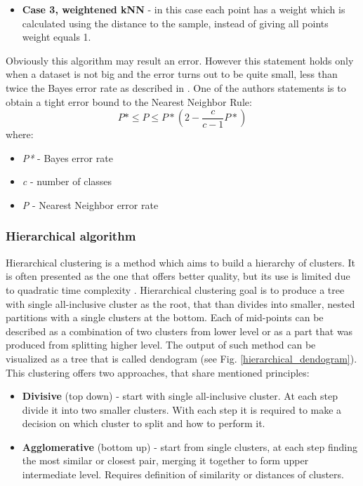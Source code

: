 \begin{itemize}
			\item \textbf{Case 3, weightened kNN} - in this case each point has a weight which is  calculated using the distance to the sample, instead of giving all points weight equals 1. 
		\end{itemize}
		
		Obviously this algorithm may result an error. However this statement holds only when a dataset is not big and the error turns out to be quite small, less than twice the Bayes error rate as described in \cite{duda-hart-classification}. One of the authors statements is to obtain a tight error bound to the Nearest Neighbor Rule:
		\[P*\leqslant P\leqslant P*(2-\frac{c}{c-1}P*)\]
		where:
		\begin{itemize}
			\item \textit{P*} - Bayes error rate
			\item \textit{c} - number of classes
			\item \textit{P} - Nearest Neighbor error rate
		\end{itemize}
	
	\subsubsection{Hierarchical algorithm}
	Hierarchical clustering is a method which aims to build a hierarchy of clusters. It is often presented as the one that offers better quality, but its use is limited due to quadratic time complexity \cite{k_means}. Hierarchical clustering goal is to produce a tree with single all-inclusive cluster as the root, that than divides into smaller, nested partitions with a single clusters at the bottom. Each of mid-points can be described as a combination of two clusters from lower level or as a part that was produced from splitting higher level. The output of such method can be visualized as a tree that is called dendogram (see Fig. \ref{hierarchical_dendogram}). This clustering offers two approaches, that share mentioned principles:
	
	\begin{itemize}
	\item \textbf{Divisive} (top down) - start with single all-inclusive cluster. At each step divide it into two smaller clusters. With each step it is required to make a decision on which cluster to split and how to perform it.
	\item \textbf{Agglomerative} (bottom up) - start from single clusters, at each step finding the most similar or closest pair, merging it together to form upper intermediate level. Requires definition of similarity or distances of clusters.
	\end{itemize}
	
